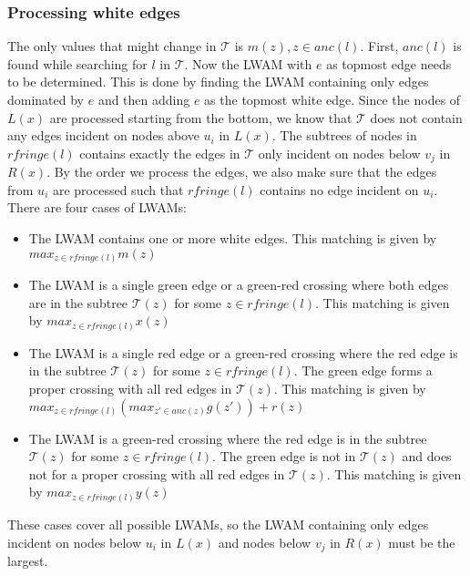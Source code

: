 \subsubsection{Processing white edges}
The only values that might change in $\mathcal{T}$ is $m(z), z \in anc(l)$. First, $anc(l)$ is found while searching for $l$ in $\mathcal{T}$. Now the LWAM with $e$ as topmost edge needs to be determined. This is done by finding the LWAM containing only edges dominated by $e$ and then adding $e$ as the topmost white edge. Since the nodes of $L(x)$ are processed starting from the bottom, we know that $\mathcal{T}$ does not contain any edges incident on nodes above $u_i$ in $L(x)$. The subtrees of nodes in $rfringe(l)$ contains exactly the edges in $\mathcal{T}$ only incident on nodes below $v_j$ in $R(x)$. By the order we process the edges, we also make sure that the edges from $u_i$ are processed such that $rfringe(l)$ contains no edge incident on $u_i$. There are four cases of LWAMs:
\begin{itemize}
	\item The LWAM contains one or more white edges.
	\subitem This matching is given by $max_{z \in rfringe(l)} m(z)$
	\item The LWAM is a single green edge or a green-red crossing where both edges are in the subtree $\mathcal{T}(z)$ for some $z \in rfringe(l)$.
	\subitem This matching is given by $max_{z \in rfringe(l)} x(z)$
	\item The LWAM is a single red edge or a green-red crossing where the red edge is in the subtree $\mathcal{T}(z)$ for some $z \in rfringe(l)$. The green edge forms a proper crossing with all red edges in $\mathcal{T}(z)$.
	\subitem This matching is given by $max_{z \in rfringe(l)} (max_{z' \in anc(z)} g(z')) + r(z)$
	\item The LWAM is a green-red crossing where the red edge is in the subtree $\mathcal{T}(z)$ for some $z \in rfringe(l)$. The green edge is not in $\mathcal{T}(z)$ and does not for a proper crossing with all red edges in $\mathcal{T}(z)$.
	This matching is given by $max_{z \in rfringe(l)} y(z)$
\end{itemize}

These cases cover all possible LWAMs, so the LWAM containing only edges incident on nodes below $u_i$ in $L(x)$ and nodes below $v_j$ in $R(x)$ must be the largest.


